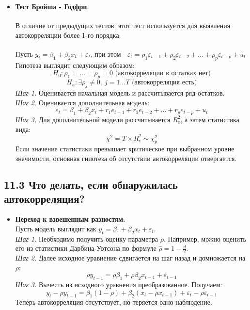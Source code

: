 \documentclass[a0,final]{a0poster}
\begin{document}
\begin{multicols}{4}
\begin{itemize}
\item \textbf{Тест Бройша - Годфри}. \\
\\
В отличие от предыдущих тестов, этот тест используется для выявления автокорреляции более 1-го порядка. \\
\\
Пусть $y_t=\beta_1+\beta_2x_t+\varepsilon_t$, при этом $\;$ $\varepsilon_t=\rho_1\varepsilon_{t-1}+\rho_2\varepsilon_{t-2}+\dotsc+\rho_p\varepsilon_{t-p}+u_t$ \\
Гипотеза выглядит следующим образом:
\[H_0: \rho_1=\dotsc=\rho_p=0 \text{ (автокорреляции в остатках нет)}\]
\[H_a: \exists\rho_j\neq0,\:j=1\dotsc T \text{ (автокорреляция есть)}\]
\textit{Шаг 1.} Оценивается начальная модель и рассчитывается ряд остатков. \\
\textit{Шаг 2.} Оценивается дополнительная модель:
\[e_t=\beta_1+\beta_2x_t+r_1e_{t-1}+r_2e_{t-2}+\dotsc+r_pe_{t-p}+u_t\]
\textit{Шаг 3.} Для дополнительной модели рассчитывается $R^2_{e}$, а затем статистика вида:
\[\chi^2 = T\times R^2_{e}\sim\chi^2_p\]
Если значение статистики превышает критическое при выбранном уровне значимости, основная гипотеза об отсутствии автокорреляции отвергается.

\end{itemize}

\subsection*{\textbf{11.3 Что делать, если обнаружилась автокорреляция?}}
\begin{itemize}

\item \textbf{Переход к взвешенным разностям.} \\
Пусть модель выглядит как $y_t = \beta_1 + \beta_2x_t + \varepsilon_t$.\\
\textit{Шаг 1.} Необходимо получить оценку параметра $\rho$. Например, можно оценить его из статистики Дарбина-Уотсона по формуле $\hat{\rho}=1-\frac{d}{2}$. \\
\textit{Шаг 2.} Далее исходное уравнение сдвигается на шаг назад и домножается на $\rho$:
\[\rho y_{t-1}=\rho \beta_1 + \rho \beta_2x_{t-1}+\varepsilon_{t-1}\]
\textit{Шаг 3.} Вычесть из исходного уравнения преобразованное. Получаем: \[y_t-\rho y_{t-1} = \beta_1(1-\rho) +\beta_2(x_t - \rho x_{t-1}) + \varepsilon_t - \rho \varepsilon_{t-1}\]
Теперь автокорреляция отсутствует, но теряется одно наблюдение.\\


\end{itemize}
\end{multicols}
\end{document}
